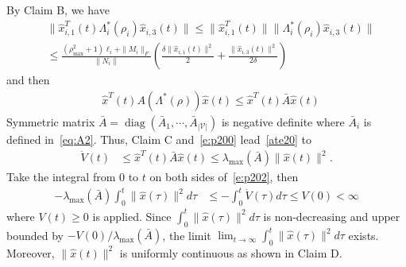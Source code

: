 \documentclass[journal]{IEEEtran}
\newcommand{\lbd}{{\lambda}}
\newcommand{\nnum}{\nonumber}
\newcommand{\VV}{{\mathcal{V}}}
\newcommand{\diag}[1]{\operatorname{diag}(#1)}
\begin{document}
By Claim B, we have 
\begin{align*}
&\|\hat{x}_{i,1}^T(t) \Lambda_i^*(\rho_i) \hat{x}_{i,3}(t)\| \leq \|\hat{x}_{i,1}^T(t)\| \|\Lambda_i^*(\rho_i)\hat{x}_{i,3}(t)\| \nnum\\
&\leq \frac{(\rho_{\max}^2+1) \ell_i + \|M_i\|_F}{\|N_i\|}(\frac{\delta\|\hat{x}_{i,1}(t)\|^2}{2} + \frac{\|\hat{x}_{i,3}(t)\|^2}{2\delta})
\end{align*}
and then
\begin{align} 
&\hat{x}^T(t)A(\Lambda^*(\rho))\hat{x}(t)\leq \hat{x}^T(t)\bar{A}\hat{x}(t)
\label{e:p200}
\end{align}
Symmetric matrix $\bar{A} = \diag{\bar{A}_1,\cdots,\bar{A}_{|{\VV}|}}$ is negative definite where $\bar{A}_i$ is defined in~\eqref{eq:A2}.
Thus, Claim C and~\eqref{e:p200} lead~\eqref{ate20} to 
\begin{align} 
\dot{V}(t)&\leq\hat{x}^T(t)\bar{A}\hat{x}(t) \leq \lbd_{\max}(\bar{A})\|\hat{x}(t)\|^2.
\label{e:p202}
\end{align}
Take the integral from $0$ to $t$ on both sides of~\eqref{e:p202}, then
\begin{align*}
- \lambda_{\max}(\bar{A}) \int_{0}^{t}\|\hat{x}(\tau)\|^2d\tau &\leq -\int_{0}^{t}\dot{V}(\tau)d\tau \leq V(0)<\infty
\end{align*}
where $V(t)\geq 0$ is applied.
Since $\int_{0}^{t}\|\hat{x}(\tau)\|^2d\tau$ is non-decreasing and upper bounded by $-V(0)/\lambda_{\max}(\bar{A})$, the limit $\lim_{t \rightarrow \infty}\int_{0}^{t}\|\hat{x}(\tau)\|^2d\tau$ exists.
Moreover, $\|\hat{x}(t)\|^2$ is uniformly continuous as shown in Claim D.
\end{document}
